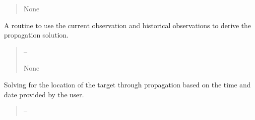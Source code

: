 \documentclass[letterpaper,11pt,english]{sphinxmanual}
\begin{document}
\begin{savenotes}
\begin{fulllineitems}
\begin{savenotes}
\begin{fulllineitems}
\begin{quote}
\begin{description}
\sphinxAtStartPar
None

\end{description}\end{quote}

\end{fulllineitems}\end{savenotes}


\begin{savenotes}\begin{fulllineitems}
\label{\detokenize{code/opihiexarata.gui.manual:opihiexarata.gui.manual.OpihiManualWindow.__connect_push_button_photometry_solve_photometry}}
\pysigstartsignatures
{}
\pysigstopsignatures
\sphinxAtStartPar
A routine to use the current observation and historical observations
to derive the propagation solution.
\begin{quote}\begin{description}
\sphinxAtStartPar
{} – 

\sphinxAtStartPar
None

\end{description}\end{quote}

\end{fulllineitems}\end{savenotes}


\begin{savenotes}\begin{fulllineitems}
\label{\detokenize{code/opihiexarata.gui.manual:opihiexarata.gui.manual.OpihiManualWindow.__connect_push_button_propagate_custom_solve}}
\pysigstartsignatures
{}
\pysigstopsignatures
\sphinxAtStartPar
Solving for the location of the target through propagation based on
the time and date provided by the user.
\begin{quote}\begin{description}
\sphinxAtStartPar
{} – 


\end{description}
\end{quote}
\end{fulllineitems}
\end{savenotes}
\end{fulllineitems}
\end{savenotes}
\end{document}
